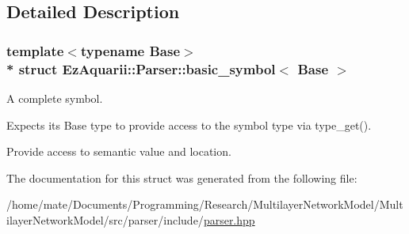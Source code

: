 \subsection{Detailed Description}
\subsubsection*{template$<$typename Base$>$\\*
struct Ez\+Aquarii\+::\+Parser\+::basic\+\_\+symbol$<$ Base $>$}

A complete symbol.

Expects its Base type to provide access to the symbol type via type\+\_\+get().

Provide access to semantic value and location. 

The documentation for this struct was generated from the following file\+:\begin{DoxyCompactItemize}
\item 
/home/mate/\+Documents/\+Programming/\+Research/\+Multilayer\+Network\+Model/\+Multilayer\+Network\+Model/src/parser/include/\hyperlink{parser_8hpp}{parser.\+hpp}\end{DoxyCompactItemize}
